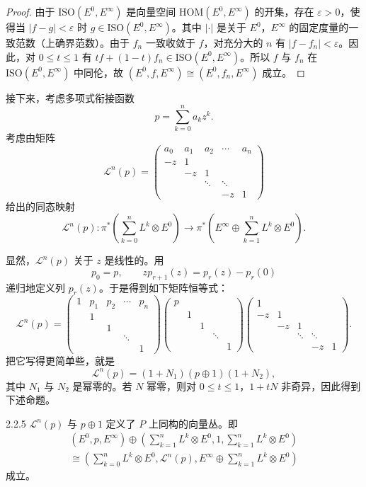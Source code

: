 \begin{proof}
  由于 $\mathrm{ISO}(E^0,E^\infty)$ 是向量空间 $\mathrm{HOM}(E^0,E^\infty)$ 的开集，存在 $\varepsilon>0$，使得当 $|f-g|<\varepsilon$ 时 $g\in\mathrm{ISO}(E^0,E^\infty)$。其中 $|\cdot|$ 是关于 $E^0$，$E^\infty$ 的固定度量的一致范数（上确界范数）。由于 $f_n$ 一致收敛于 $f$，对充分大的 $n$ 有 $|f-f_n|<\varepsilon$。因此，对 $0\le t\le1$ 有 $tf+(1-t)f_n\in\mathrm{ISO}(E^0,E^\infty)$。所以 $f$ 与 $f_n$ 在 $\mathrm{ISO}(E^0,E^\infty)$ 中同伦，故 $(E^0,f,E^\infty)\cong(E^0,f_n,E^\infty)$
成立。
\end{proof}

接下来，考虑多项式衔接函数
\[
p=\sum_{k=0}^{n}a_kz^k.
\]
考虑由矩阵
\[
\mathcal{L}^n(p)=
\begin{pmatrix}
a_0 & a_1 & a_2 & \cdots & a_n\\
-z & 1 & & & \\
& -z & 1 & & \\
& & \ddots & \ddots & \\
& & & -z & 1
\end{pmatrix}
\]
给出的同态映射
\[
\mathcal{L}^n(p)\colon\pi^{*}\left(\sum_{k=0}^{n}L^k\otimes E^0\right)\longrightarrow\pi^{*}\left(E^\infty\oplus\sum_{k=1}^{n}L^k\otimes E^0\right).
\]

显然，$\mathcal{L}^n(p)$ 关于 $z$ 是线性的。用
\[
p_0=p,\qquad zp_{r+1}(z)=p_r(z)-p_r(0)
\]
递归地定义列 $p_r(z)$。于是得到如下矩阵恒等式：
\[
\mathcal{L}^n(p)=
\begin{pmatrix}
1 & p_1 & p_2 & \cdots & p_n\\
& 1 & & & \\
& & 1 & & \\
& & & \ddots & \\
& & & & 1
\end{pmatrix}
\begin{pmatrix}
p & & & & \\
& 1 & & & \\
& & 1 & & \\
& & & \ddots & \\
& & & & 1
\end{pmatrix}
\begin{pmatrix}
1 & & & & \\
-z & 1 & & & \\
& -z & 1 & & \\
& & \ddots & \ddots & \\
& & & -z & 1
\end{pmatrix}.
\]
把它写得更简单些，就是
\[
\mathcal{L}^n(p)=(1+N_1)(p\oplus1)(1+N_2),
\]
其中 $N_1$ 与 $N_2$ 是幂零的。若 $N$ 幂零，则对 $0\le t\le1$，$1+tN$ 非奇异，因此得到下述命题。
\begin{proposition*}{2.2.5}
  $\mathcal{L}^n(p)$ 与 $p\oplus1$ 定义了 $P$ 上同构的向量丛。即
  \[
  \begin{gathered}
  (E^0,p,E^\infty)\oplus\left(\sum_{k=1}^{n}L^k\otimes E^0,1,\sum_{k=1}^{n}L^k\otimes E^0\right)\\
  \cong\left(\sum_{k=0}^{n}L^k\otimes E^0,\mathcal{L}^n(p),E^\infty\oplus\sum_{k=1}^{n}L^k\otimes E^0\right)
  \end{gathered}
  \]
  成立。
\end{proposition*}

